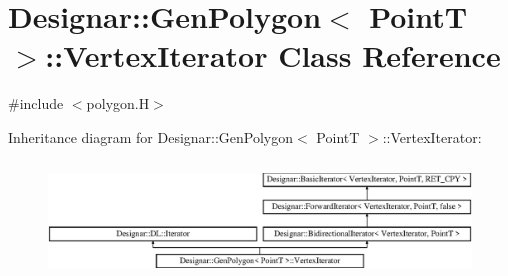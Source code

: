 \hypertarget{class_designar_1_1_gen_polygon_1_1_vertex_iterator}{}\section{Designar\+:\+:Gen\+Polygon$<$ PointT $>$\+:\+:Vertex\+Iterator Class Reference}
\label{class_designar_1_1_gen_polygon_1_1_vertex_iterator}


{\ttfamily \#include $<$polygon.\+H$>$}

Inheritance diagram for Designar\+:\+:Gen\+Polygon$<$ PointT $>$\+:\+:Vertex\+Iterator\+:\begin{figure}[H]
\begin{center}
\leavevmode
\includegraphics[height=3.128492cm]{class_designar_1_1_gen_polygon_1_1_vertex_iterator}
\end{center}
\end{figure}
